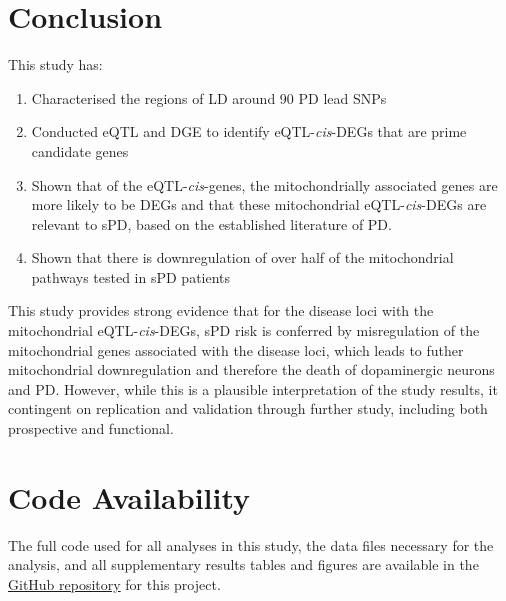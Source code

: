 \documentclass{article}
\begin{document}
\section{Conclusion}
This study has:
\begin{enumerate}
    \item Characterised the regions of LD around 90 PD lead SNPs
    \item Conducted eQTL and DGE to identify eQTL-\textit{cis}-DEGs that are prime candidate genes
    \item Shown that of the eQTL-\textit{cis}-genes, the mitochondrially associated genes are more likely to be DEGs and that these mitochondrial eQTL-\textit{cis}-DEGs are relevant to sPD, based on the established literature of PD.
    \item Shown that there is downregulation of over half of the mitochondrial pathways tested in sPD patients
\end{enumerate}
This study provides strong evidence that for the disease loci with the mitochondrial eQTL-\textit{cis}-DEGs, sPD risk is conferred by misregulation of the mitochondrial genes associated with the disease loci, which leads to futher mitochondrial downregulation and therefore the death of dopaminergic neurons and PD. However, while this is a plausible interpretation of the study results, it contingent on replication and validation through further study, including both prospective and functional.
\newpage
\section{Code Availability}
The full code used for all analyses in this study, the data files necessary for the analysis, and all supplementary results tables and figures are available in the \href{https://github.com/Thomas-brightwell/PD-MSc-project-code/tree/main}{GitHub repository} for this project.
\newpage
\begin{singlespace}
\printbibliography
\end{singlespace}
\end{document}
